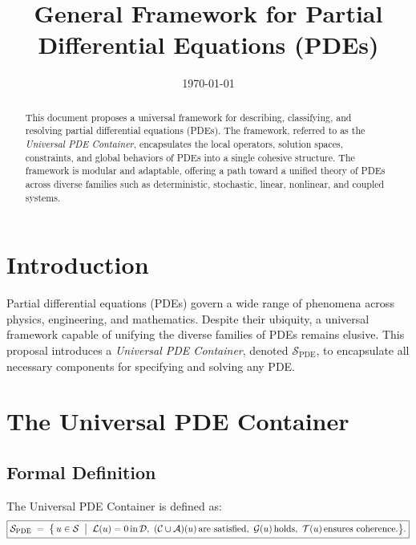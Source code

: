 \documentclass[12pt]{article}
\title{General Framework for Partial Differential Equations (PDEs)}
\author{}
\date{\today}
\begin{document}
\maketitle

\begin{abstract}
This document proposes a universal framework for describing, classifying, and resolving partial differential equations (PDEs). The framework, referred to as the \textit{Universal PDE Container}, encapsulates the local operators, solution spaces, constraints, and global behaviors of PDEs into a single cohesive structure. The framework is modular and adaptable, offering a path toward a unified theory of PDEs across diverse families such as deterministic, stochastic, linear, nonlinear, and coupled systems.
\end{abstract}

\tableofcontents

\section{Introduction}
Partial differential equations (PDEs) govern a wide range of phenomena across physics, engineering, and mathematics. Despite their ubiquity, a universal framework capable of unifying the diverse families of PDEs remains elusive. This proposal introduces a \textit{Universal PDE Container}, denoted \(\mathcal{S}_{\text{PDE}}\), to encapsulate all necessary components for specifying and solving any PDE.

\section{The Universal PDE Container}
\subsection{Formal Definition}
The Universal PDE Container is defined as:
\[
\boxed{
\mathcal{S}_{\text{PDE}}
\;=\;
\bigl\{
\,u \in \mathcal{S}
\;\bigm|\;
\mathcal{L}(u) = 0\,\text{in}\,\mathcal{D},\
(\mathcal{C} \cup \mathcal{A})(u)\,\text{are satisfied},\
\mathcal{G}(u)\,\text{holds},\
\mathcal{T}(u)\,\text{ensures coherence.}
\bigr\}
.}
\]
\end{document}
